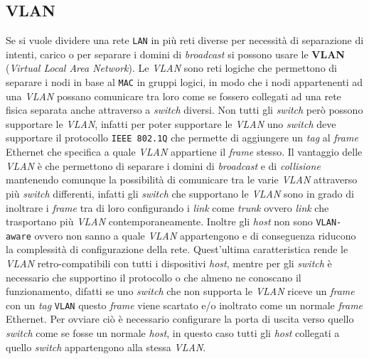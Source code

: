     \subsection{VLAN}
        Se si vuole dividere una rete \texttt{LAN} in più reti diverse per necessità di separazione di intenti, carico o per separare i domini di \textit{broadcast} si possono usare le \textbf{VLAN} (\textit{Virtual Local Area Network}).\newline
        Le \textit{VLAN} sono reti logiche che permettono di separare i nodi in base al \texttt{MAC} in gruppi logici, in modo che i nodi appartenenti ad una \textit{VLAN} possano comunicare tra loro come se fossero collegati ad una rete fisica separata anche attraverso a \textit{switch} diversi.\newline
        Non tutti gli \textit{switch} però possono supportare le \textit{VLAN}, infatti per poter supportare le \textit{VLAN} uno \textit{switch} deve supportare il protocollo \texttt{IEEE 802.1Q} che permette di aggiungere un \textit{tag} al \textit{frame} Ethernet che specifica a quale \textit{VLAN} appartiene il \textit{frame} stesso.\newline
        Il vantaggio delle \textit{VLAN} è che permettono di separare i domini di \textit{broadcast} e di \textit{collisione} mantenendo comunque la possibilità di comunicare tra le varie \textit{VLAN} attraverso più \textit{switch} differenti, infatti gli \textit{switch} che supportano le \textit{VLAN} sono in grado di inoltrare i \textit{frame} tra di loro configurando i \textit{link} come \textit{trunk} ovvero \textit{link} che trasportano più \textit{VLAN} contemporaneamente. Inoltre gli \textit{host} non sono \texttt{VLAN-aware} ovvero non sanno a quale \textit{VLAN} appartengono e di conseguenza riducono la complessità di configurazione della rete.\newline
        Quest'ultima caratteristica rende le \textit{VLAN} retro-compatibili con tutti i dispositivi \textit{host}, mentre per gli \textit{switch} è necessario che supportino il protocollo o che almeno ne conoscano il funzionamento, difatti se uno \textit{switch} che non supporta le \textit{VLAN} riceve un \textit{frame} con un \textit{tag} \texttt{VLAN} questo \textit{frame} viene scartato e/o inoltrato come un normale \textit{frame} Ethernet. Per ovviare ciò è necessario configurare la porta di uscita verso quello \textit{switch} come se fosse un normale \textit{host}, in questo caso tutti gli \textit{host} collegati a quello \textit{switch} appartengono alla stessa \textit{VLAN}.
